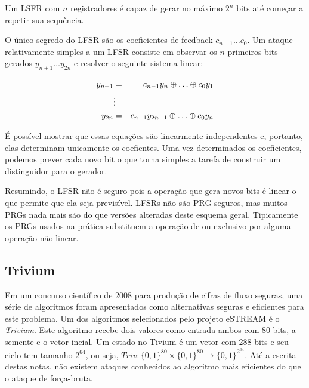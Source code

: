 Um LSFR com $n$ registradores é capaz de gerar no máximo $2^n$ bits até começar a repetir sua sequência.

O único segredo do LFSR são os coeficientes de feedback $c_{n-1} \dots c_0$.
Um ataque relativamente simples a um LFSR consiste em observar os $n$ primeiros bits gerados $y_{n+1} \dots y_{2n}$ e resolver o seguinte sistema linear:

\begin{eqnarray*}
  y_{n+1} &    =   & c_{n-1}y_n \xor \dots \xor c_0 y_1\\
         & \vdots &  \\
  y_{2n}  &    =   & c_{n-1}y_{2n-1} \xor \dots \xor c_0 y_n\\      
\end{eqnarray*}

É possível mostrar que essas equações são linearmente independentes e, portanto, elas determinam unicamente os coefientes.
Uma vez determinados os coeficientes, podemos prever cada novo bit o que torna simples a tarefa de construir um distinguidor para o gerador.

Resumindo, o LFSR não é seguro pois a operação que gera novos bits é linear o que permite que ela seja previsível.
LFSRs não são PRG seguros, mas muitos PRGs nada mais são do que versões alteradas deste esquema geral.
Tipicamente os PRGs usados na prática substituem a operação de ou exclusivo por alguma operação não linear.

\subsection{Trivium}
\label{sec:trivium}

Em um concurso científico de 2008 para produção de cifras de fluxo seguras, uma série de algoritmos foram apresentados como alternativas seguras e eficientes para este problema.
Um dos algoritmos selecionados pelo projeto eSTREAM é o {\em Trivium}.
Este algoritmo recebe dois valores como entrada ambos com 80 bits, a semente e o vetor incial.
Um estado no Tivium é um vetor com 288 bits e seu ciclo tem tamanho $2^{64}$, ou seja, $Triv: \{0,1\}^{80}\times \{0,1\}^{80} \to \{0,1\}^{2^{64}}$.
Até a escrita destas notas, não existem ataques conhecidos ao algoritmo mais eficientes do que o ataque de força-bruta.

